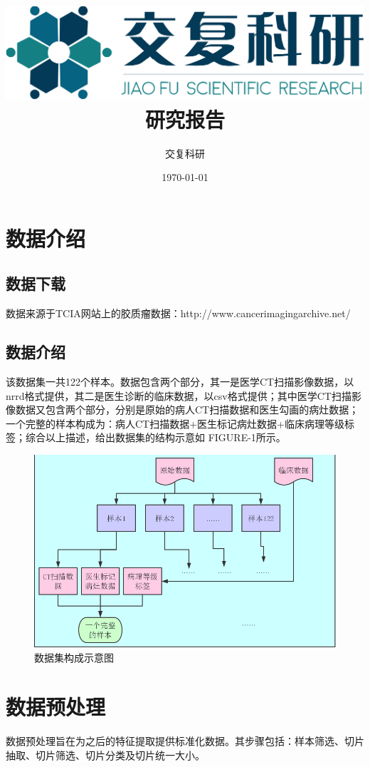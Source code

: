 \documentclass{ctexart}
\title{\includegraphics[height=4ex]{logo3}\\
\vspace{2cm}
研究报告}
\author{交复科研}
\date{\today}
\begin{document}
\maketitle

\tableofcontents
\clearpage

%
\section{数据介绍}
\subsection{数据下载}
数据来源于TCIA网站上的胶质瘤数据：http://www.cancerimagingarchive.net/
\subsection{数据介绍}
该数据集一共122个样本。数据包含两个部分，其一是医学CT扫描影像数据，以nrrd格式提供，其二是医生诊断的临床数据，以csv格式提供；其中医学CT扫描影像数据又包含两个部分，分别是原始的病人CT扫描数据和医生勾画的病灶数据；一个完整的样本构成为：病人CT扫描数据+医生标记病灶数据+临床病理等级标签；综合以上描述，给出数据集的结构示意如 FIGURE-1所示。

\begin{figure}[!htbp] 
\centering
\includegraphics[width=\linewidth]{img/flow1.png} 
\caption{数据集构成示意图}
\label{f1} 
\end{figure}

%
\section{数据预处理}
数据预处理旨在为之后的特征提取提供标准化数据。其步骤包括：样本筛选、切片抽取、切片筛选、切片分类及切片统一大小。
\end{document}
